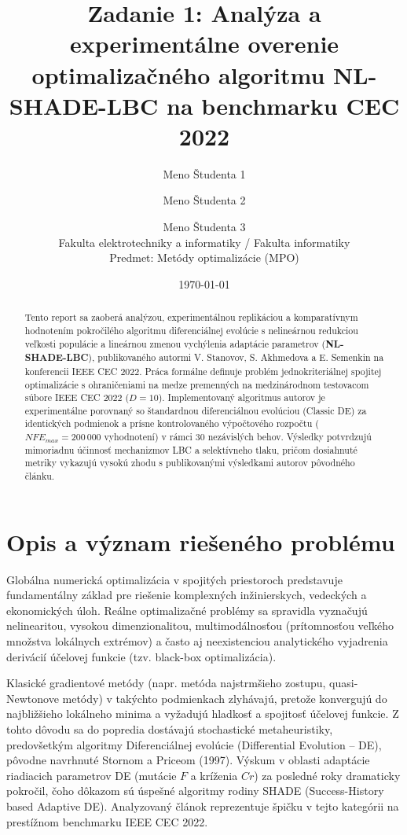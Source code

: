 \documentclass[11pt,a4paper]{article}
\title{\textbf{Zadanie 1: Analýza a experimentálne overenie optimalizačného algoritmu NL-SHADE-LBC na benchmarku CEC 2022}}
\author{Meno Študenta 1 \and Meno Študenta 2 \and Meno Študenta 3 \\
\small Fakulta elektrotechniky a informatiky / Fakulta informatiky \\
\small Predmet: Metódy optimalizácie (MPO)}
\date{\today}
\begin{document}
\maketitle

\begin{abstract}
Tento report sa zaoberá analýzou, experimentálnou replikáciou a komparatívnym hodnotením pokročilého algoritmu diferenciálnej evolúcie s nelineárnou redukciou veľkosti populácie a lineárnou zmenou vychýlenia adaptácie parametrov (\textbf{NL-SHADE-LBC}), publikovaného autormi V. Stanovov, S. Akhmedova a E. Semenkin na konferencii IEEE CEC 2022. Práca formálne definuje problém jednokriteriálnej spojitej optimalizácie s ohraničeniami na medze premenných na medzinárodnom testovacom súbore IEEE CEC 2022 ($D=10$). Implementovaný algoritmus autorov je experimentálne porovnaný so štandardnou diferenciálnou evolúciou (Classic DE) za identických podmienok a prísne kontrolovaného výpočtového rozpočtu ($NFE_{max} = 200\,000$ vyhodnotení) v rámci 30 nezávislých behov. Výsledky potvrdzujú mimoriadnu účinnosť mechanizmov LBC a selektívneho tlaku, pričom dosiahnuté metriky vykazujú vysokú zhodu s publikovanými výsledkami autorov pôvodného článku.
\end{abstract}

\section{Opis a význam riešeného problému}
Globálna numerická optimalizácia v spojitých priestoroch predstavuje fundamentálny základ pre riešenie komplexných inžinierskych, vedeckých a ekonomických úloh. Reálne optimalizačné problémy sa spravidla vyznačujú nelinearitou, vysokou dimenzionalitou, multimodálnosťou (prítomnosťou veľkého množstva lokálnych extrémov) a často aj neexistenciou analytického vyjadrenia derivácií účelovej funkcie (tzv. black-box optimalizácia).

Klasické gradientové metódy (napr. metóda najstrmšieho zostupu, quasi-Newtonove metódy) v takýchto podmienkach zlyhávajú, pretože konvergujú do najbližšieho lokálneho minima a vyžadujú hladkosť a spojitosť účelovej funkcie. Z tohto dôvodu sa do popredia dostávajú stochastické metaheuristiky, predovšetkým algoritmy Diferenciálnej evolúcie (Differential Evolution -- DE), pôvodne navrhnuté Stornom a Priceom (1997). Výskum v oblasti adaptácie riadiacich parametrov DE (mutácie $F$ a kríženia $Cr$) za posledné roky dramaticky pokročil, čoho dôkazom sú úspešné algoritmy rodiny SHADE (Success-History based Adaptive DE). Analyzovaný článok reprezentuje špičku v tejto kategórii na prestížnom benchmarku IEEE CEC 2022.
\end{document}
